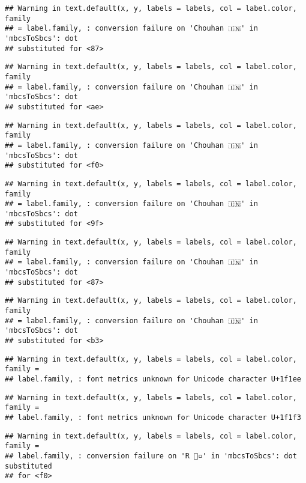 \documentclass[
]{article}
\begin{document}
\begin{verbatim}
## Warning in text.default(x, y, labels = labels, col = label.color, family
## = label.family, : conversion failure on 'Chouhan 🇮🇳' in 'mbcsToSbcs': dot
## substituted for <87>
\end{verbatim}

\begin{verbatim}
## Warning in text.default(x, y, labels = labels, col = label.color, family
## = label.family, : conversion failure on 'Chouhan 🇮🇳' in 'mbcsToSbcs': dot
## substituted for <ae>
\end{verbatim}

\begin{verbatim}
## Warning in text.default(x, y, labels = labels, col = label.color, family
## = label.family, : conversion failure on 'Chouhan 🇮🇳' in 'mbcsToSbcs': dot
## substituted for <f0>
\end{verbatim}

\begin{verbatim}
## Warning in text.default(x, y, labels = labels, col = label.color, family
## = label.family, : conversion failure on 'Chouhan 🇮🇳' in 'mbcsToSbcs': dot
## substituted for <9f>
\end{verbatim}

\begin{verbatim}
## Warning in text.default(x, y, labels = labels, col = label.color, family
## = label.family, : conversion failure on 'Chouhan 🇮🇳' in 'mbcsToSbcs': dot
## substituted for <87>
\end{verbatim}

\begin{verbatim}
## Warning in text.default(x, y, labels = labels, col = label.color, family
## = label.family, : conversion failure on 'Chouhan 🇮🇳' in 'mbcsToSbcs': dot
## substituted for <b3>
\end{verbatim}

\begin{verbatim}
## Warning in text.default(x, y, labels = labels, col = label.color, family =
## label.family, : font metrics unknown for Unicode character U+1f1ee
\end{verbatim}

\begin{verbatim}
## Warning in text.default(x, y, labels = labels, col = label.color, family =
## label.family, : font metrics unknown for Unicode character U+1f1f3
\end{verbatim}

\begin{verbatim}
## Warning in text.default(x, y, labels = labels, col = label.color, family =
## label.family, : conversion failure on 'R 🔸▫️' in 'mbcsToSbcs': dot substituted
## for <f0>
\end{verbatim}
\end{document}
